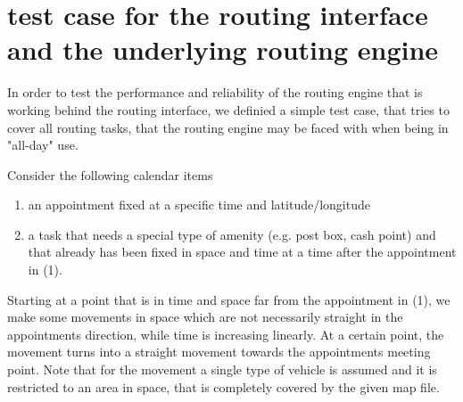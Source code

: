 \section{test case for the routing interface and the underlying routing engine}

In order to test the performance and reliability of the routing engine that is working behind the routing interface, we definied a simple test case, that tries to cover all routing tasks, that the routing engine may be faced with when being in "all-day" use.\newline

Consider the following calendar items
\begin{enumerate}
	\item an appointment fixed at a specific time and latitude/longitude
	\item a task that needs a special type of amenity (e.g. post box, cash point) and that already has been fixed in space and time at a time after the appointment in (1).
\end{enumerate}

Starting at a point that is in time and space far from the appointment in (1), we make some movements in space which are not necessarily straight in the appointments direction, while time is increasing linearly. At a certain point, the movement turns into a straight movement towards the appointments meeting point. Note that for the movement a single type of vehicle is assumed and it is restricted to an area in space, that is completely covered by the given map file.\newline

